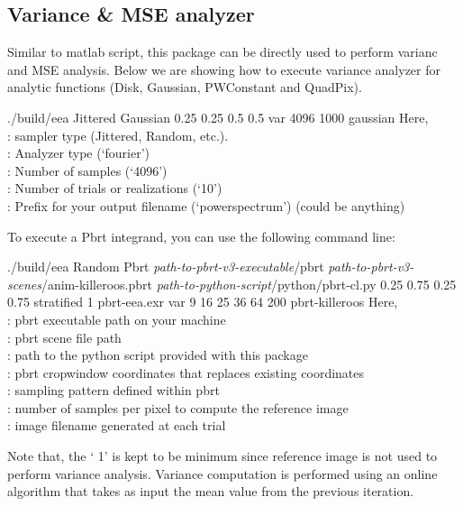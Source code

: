 \subsection{Variance \& MSE analyzer}
\label{sec:erranalyzer}

Similar to matlab script, this package can be directly used to perform varianc and MSE analysis. 
Below we are showing how to execute variance analyzer for analytic functions (Disk, Gaussian, PWConstant and QuadPix).  
%
\begin{tcolorbox}
./build/eea   Jittered   Gaussian  0.25 0.25  0.5 0.5   var  4096  1000    gaussian
\tcblower
Here, \\
: sampler type (Jittered, Random, etc.). \\
:  Analyzer type (`fourier') \\
: Number of samples (`4096') \\
: Number of trials or realizations (`10') \\
: Prefix for your output filename (`powerspectrum') (could be anything)
\end{tcolorbox}
%
To execute a Pbrt integrand, you can use the following command line:
%
\begin{tcolorbox}
./build/eea   Random 
  Pbrt 
 \emph{path-to-pbrt-v3-executable}/pbrt 
 \emph{path-to-pbrt-v3-scenes}/anim-killeroos.pbrt 
 \emph{path-to-python-script}/python/pbrt-cl.py 
 0.25 0.75 0.25 0.75 
 stratified
 1
 pbrt-eea.exr 
  var  9 16 25 36 64  200 
  pbrt-killeroos
\tcblower
Here, \\
: pbrt executable path on your machine \\
: pbrt scene file path \\
: path to the python script provided with this package \\
: pbrt cropwindow coordinates that replaces existing coordinates \\
: sampling pattern defined within pbrt \\
: number of samples per pixel to compute the reference image \\
: image filename generated at each trial 
\end{tcolorbox}
%
Note that, the ` 1' is kept to be minimum since reference image is not used to perform 
variance analysis. Variance computation is performed using an online algorithm that takes as input 
the mean value from the previous iteration.
%

